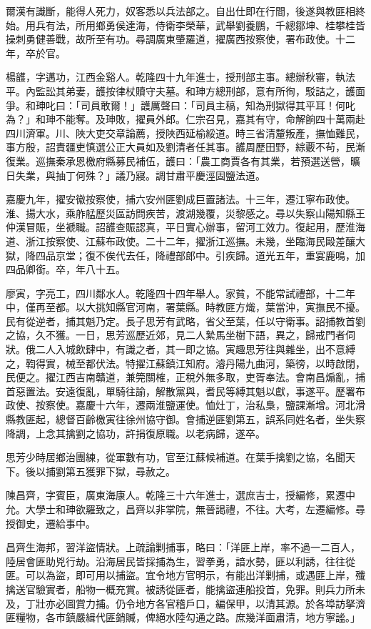 \begin{pinyinscope}
爾漢有識斷，能得人死力，奴客悉以兵法部之。自出仕即在行間，後遂與教匪相終始。用兵有法，所用鄉勇侯達海，侍衛李榮華，武舉劉養鵬，千總鄒坤、桂攀桂皆操刺勇健善戰，故所至有功。尋調廣東肇羅道，擢廣西按察使，署布政使。十二年，卒於官。

楊頀，字邁功，江西金谿人。乾隆四十九年進士，授刑部主事。總辦秋審，執法平。內監訟其弟妻，頀按律杖贖守夫墓。和珅方總刑部，意有所徇，駁詰之，頀面爭。和珅叱曰：「司員敢爾！」頀厲聲曰：「司員主稿，知為刑獄得其平耳！何叱為？」和珅不能奪。及珅敗，擢員外郎。仁宗召見，嘉其有守，命解餉四十萬兩赴四川濟軍。川、陜大吏交章論薦，授陜西延榆綏道。時三省清釐叛產，撫恤難民，事方殷，詔責疆吏慎選公正大員如及劉清者任其事。頀周歷田野，綜覈不茍，民漸復業。巡撫秦承恩檄府縣募民補伍，頀曰：「農工商賈各有其業，若預選送營，曠日失業，與抽丁何殊？」議乃寢。調甘肅平慶涇固鹽法道。

嘉慶九年，擢安徽按察使，捕六安州匪劉成巨置諸法。十三年，遷江寧布政使。淮、揚大水，乘舴艋歷災區訪問疾苦，渡湖幾覆，災黎感之。尋以失察山陽知縣王仲漢冒賑，坐褫職。詔頀查賑認真，平日實心辦事，留河工效力。復起用，歷淮海道、浙江按察使、江蘇布政使。二十二年，擢浙江巡撫。未幾，坐臨海民毆差釀大獄，降四品京堂；復不俟代去任，降禮部郎中。引疾歸。道光五年，重宴鹿鳴，加四品卿銜。卒，年八十五。

廖寅，字亮工，四川鄰水人。乾隆四十四年舉人。家貧，不能常試禮部，十二年中，僅再至都。以大挑知縣官河南，署葉縣。時教匪方熾，葉當沖，寅撫民不擾。民有從逆者，捕其魁乃定。長子思芳有武略，省父至葉，任以守衛事。詔捕教首劉之協，久不獲。一日，思芳巡歷近郊，見二人縶馬坐樹下語，異之，歸戒門者伺狀。俄二人入城飲肆中，有識之者，其一即之協。寅趣思芳往與雜坐，出不意縛之，鞫得實，械至都伏法。特擢江蘇鎮江知府。濬丹陽九曲河，築徬，以時啟閉，民便之。擢江西吉南贛道，兼筦關榷，正稅外無多取，吏胥奉法。會南昌煽亂，捕首惡置法。安遠復亂，單騎往諭，解散黨與，耆民等縛其魁以獻，事遂平。歷署布政使、按察使。嘉慶十六年，遷兩淮鹽運使。恤灶丁，治私梟，鹽課漸增。河北滑縣教匪起，總督百齡檄寅往徐州協守御。會捕逆匪劉第五，誤系同姓名者，坐失察降調，上念其擒劉之協功，許捐復原職。以老病歸，遂卒。

思芳少時居鄉治團練，從軍數有功，官至江蘇候補道。在葉手擒劉之協，名聞天下。後以捕劉第五獲罪下獄，尋赦之。

陳昌齊，字賓臣，廣東海康人。乾隆三十六年進士，選庶吉士，授編修，累遷中允。大學士和珅欲羅致之，昌齊以非掌院，無晉謁禮，不往。大考，左遷編修。尋授御史，遷給事中。

昌齊生海邦，習洋盜情狀。上疏論剿捕事，略曰：「洋匪上岸，率不過一二百人，陸居會匪助兇行劫。沿海居民皆採捕為生，習拳勇，諳水勢，匪以利誘，往往從匪。可以為盜，即可用以捕盜。宜令地方官明示，有能出洋剿捕，或遇匪上岸，殲擒送官驗實者，船物一概充賞。被誘從匪者，能擒盜連船投首，免罪。則兵力所未及，丁壯亦必圖賞力捕。仍令地方各官稽戶口，編保甲，以清其源。於各埠訪拏濟匪糧物，各市鎮嚴緝代匪銷贓，俾絕水陸勾通之路。庶幾洋面肅清，地方寧謐。」


\end{pinyinscope}
